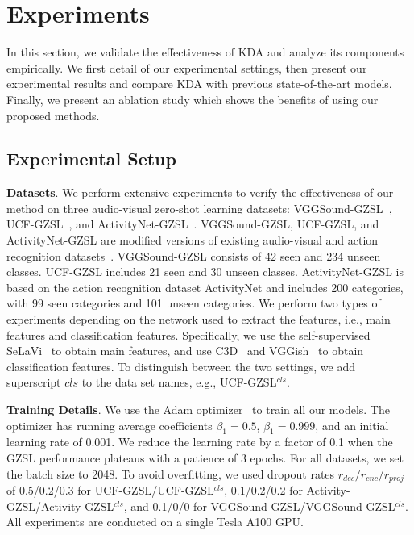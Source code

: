 \documentclass[10pt,twocolumn,letterpaper]{article}
\begin{document}
\section{Experiments}
In this section, we validate the effectiveness of KDA and analyze its components empirically. We first detail of our experimental settings, then present our experimental results and compare KDA with previous state-of-the-art models. Finally, we present an ablation study which shows the benefits of using our proposed methods.

\subsection{Experimental Setup}

\textbf{Datasets}. We perform extensive experiments to verify the effectiveness of our method on three audio-visual zero-shot learning datasets: VGGSound-GZSL~\cite{AVCA}, UCF-GZSL~\cite{AVCA}, and ActivityNet-GZSL~\cite{AVCA}. 
VGGSound-GZSL, UCF-GZSL, and ActivityNet-GZSL are modified versions of existing audio-visual and action recognition datasets~\cite{Vggsound,UCF101,Activitynet}. VGGSound-GZSL consists of 42 seen and 234 unseen classes. UCF-GZSL includes 21 seen and 30 unseen classes. ActivityNet-GZSL is based on the action recognition dataset ActivityNet and includes 200 categories, with 99 seen categories and 101 unseen categories.
We perform two types of experiments depending on the network used to extract the features, i.e., main features and classification features.
Specifically, we use the self-supervised SeLaVi~\cite{Asano_Patrick_Rupprecht_Vedaldi_2020} to obtain main features, and use C3D~\cite{C3D} and VGGish~\cite{Vggish} to obtain classification features.
To distinguish between the two settings, we add superscript ${cls}$ to the data set names, e.g., UCF-GZSL$^{cls}$.

\noindent
\textbf{Training Details}.
We use the Adam optimizer~\cite{adam} to train all our models. The optimizer has running average coefficients $\beta_1=0.5$, $\beta_1=0.999$, and an initial learning rate of 0.001. We reduce the learning rate by a factor of 0.1 when the GZSL performance plateaus with a patience of 3 epochs. For all datasets, we set the batch size to 2048.
To avoid overfitting, we used dropout rates $r_{dec}/r_{enc}/r_{proj}$ of 0.5/0.2/0.3 for UCF-GZSL/UCF-GZSL$^{cls}$, 0.1/0.2/0.2 for Activity-GZSL/Activity-GZSL$^{cls}$, and 0.1/0/0 for VGGSound-GZSL/VGGSound-GZSL$^{cls}$.
All experiments are conducted on a single Tesla A100 GPU.
\end{document}
